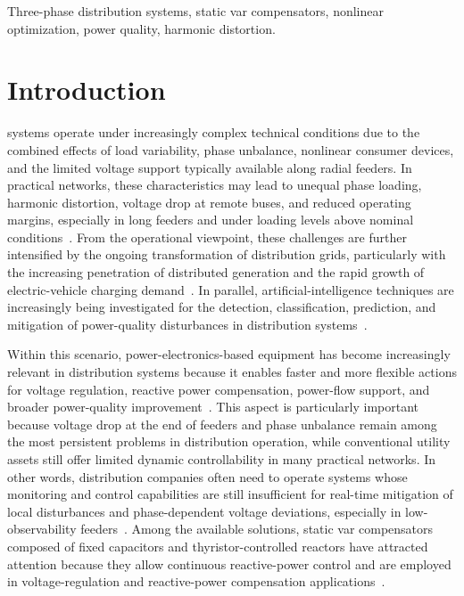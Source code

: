 \documentclass[journal]{IEEEtran}
\begin{document}
\begin{IEEEkeywords}
Three-phase distribution systems, static var compensators, nonlinear optimization, power quality, harmonic distortion.
\end{IEEEkeywords}

\section{Introduction}
 systems operate under increasingly complex technical conditions due to the combined effects of load variability, phase unbalance, nonlinear consumer devices, and the limited voltage support typically available along radial feeders. In practical networks, these characteristics may lead to unequal phase loading, harmonic distortion, voltage drop at remote buses, and reduced operating margins, especially in long feeders and under loading levels above nominal conditions~\cite{loji2023operational}. From the operational viewpoint, these challenges are further intensified by the ongoing transformation of distribution grids, particularly with the increasing penetration of distributed generation and the rapid growth of electric-vehicle charging demand~\cite{nasir2024hosting,ghaffari2025planning}. In parallel, artificial-intelligence techniques are increasingly being investigated for the detection, classification, prediction, and mitigation of power-quality disturbances in distribution systems~\cite{dehaghani2025ai}.

Within this scenario, power-electronics-based equipment has become increasingly relevant in distribution systems because it enables faster and more flexible actions for voltage regulation, reactive power compensation, power-flow support, and broader power-quality improvement~\cite{Stanelyte2020VoltVar}. This aspect is particularly important because voltage drop at the end of feeders and phase unbalance remain among the most persistent problems in distribution operation, while conventional utility assets still offer limited dynamic controllability in many practical networks. In other words, distribution companies often need to operate systems whose monitoring and control capabilities are still insufficient for real-time mitigation of local disturbances and phase-dependent voltage deviations, especially in low-observability feeders~\cite{Yadav2023DSSE}. Among the available solutions, static var compensators composed of fixed capacitors and thyristor-controlled reactors have attracted attention because they allow continuous reactive-power control and are employed in voltage-regulation and reactive-power compensation applications~\cite{Stanelyte2020VoltVar,Liu2020SVCUnbalance}.
\end{document}
